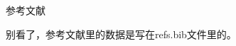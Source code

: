 \documentclass[logoopacity=0.1]{scnubeamer}
\theoremstyle{definition}
\theoremstyle{example}
\begin{document}
\begin{frame}[label=blank_page]

\end{frame}

\begin{frame}[allowframebreaks]{参考文献}
\printbibliography
\end{frame}

\begin{frame}
别看了，参考文献里的数据是写在refs.bib文件里的。
\end{frame}
\end{document}
